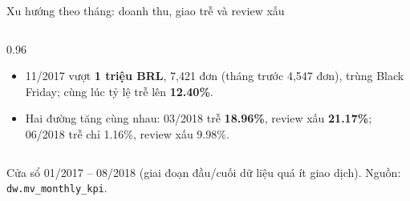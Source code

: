 \documentclass[aspectratio=169,10pt,xcolor=table]{beamer}
\begin{document}
\begin{frame}{Xu hướng theo tháng: doanh thu, giao trễ và review xấu}
  \vspace{0.05cm}
  \begin{columns}[T]
    \begin{column}{0.96\textwidth}
      \footnotesize
      \begin{itemize}
        \item 11/2017 vượt \textbf{1 triệu BRL}, 7,421 đơn (tháng trước 4,547 đơn), trùng Black Friday; cùng lúc tỷ lệ trễ lên \textbf{12.40\%}.
        \item Hai đường tăng cùng nhau: 03/2018 trễ \textbf{18.96\%}, review xấu \textbf{21.17\%}; 06/2018 trễ chỉ 1.16\%, review xấu 9.98\%.
      \end{itemize}
    \end{column}
  \end{columns}
  \vspace{0.1cm}
  {\tiny\color{muted}\hspace{0.3cm}Cửa sổ 01/2017 -- 08/2018 (giai đoạn đầu/cuối dữ liệu quá ít giao dịch). Nguồn: \texttt{dw.mv\_monthly\_kpi}.\par}
\end{frame}
\end{document}
